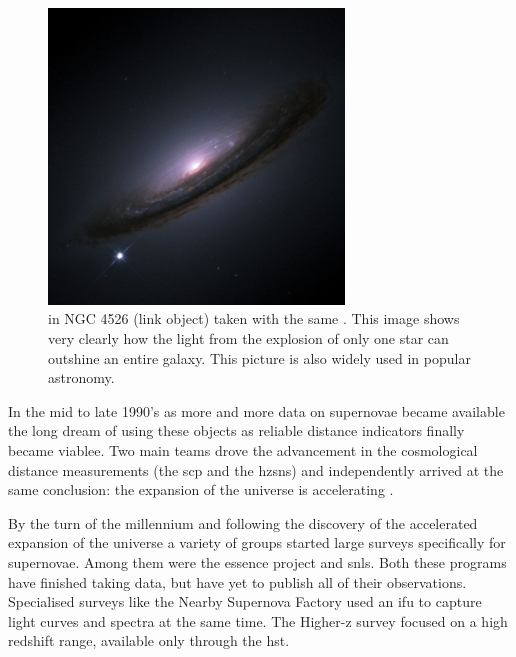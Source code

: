 \begin{figure}[htbp] %
   \centering
   \includegraphics[width=0.7\textwidth]{chapter_intro/plots/sn1994d.jpg} 
   \caption{ in NGC 4526 (link object) taken with the same . This image shows very clearly how the light from the explosion of only one star can outshine an entire galaxy. This picture is also widely used in popular astronomy.}
   \label{fig:sn1994d}
\end{figure}

In the mid to late 1990's as more and more data on supernovae became available the long dream \citep[e.g.][]{1938ApJ....88..285B, 1960ZA.....49..201V, 1968AJ.....73.1021K} of using these objects as reliable distance indicators finally became viablee. Two main teams drove the advancement in the cosmological distance measurements (the \gls{scp} and the \gls{hzsns}) and independently arrived at the same conclusion: the expansion of the universe is accelerating \citep{1998AJ....116.1009R,1999ApJ...517..565P}.

By the turn of the millennium and following the discovery of the accelerated expansion of the universe a variety of groups started large surveys specifically for supernovae. Among them were the \gls{essence} project and \gls{snls}. Both these programs have finished taking data, but have yet to publish all of their observations. Specialised surveys like the Nearby Supernova Factory \citep{2002SPIE.4836...61A} used an \gls{ifu} to capture light curves and spectra at the same time. The Higher-z survey \citep{2004ApJ...613..200S} focused on a high redshift range, available only through the \gls{hst}.

